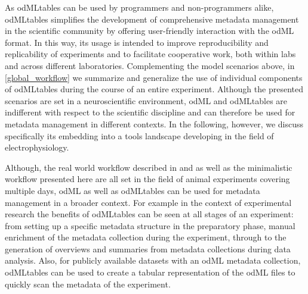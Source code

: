 As odMLtables can be used by programmers and non-programmers alike, odMLtables simplifies the development of comprehensive metadata management in the scientific community by offering user-friendly interaction with the odML format. In this way, its usage is intended to improve reproducibility and replicability of experiments and to facilitate cooperative work, both within labs and across different laboratories. Complementing the model scenarios above, in \cref{global_workflow} we summarize and generalize the use of individual components of odMLtables during the course of an entire experiment. Although the presented scenarios are set in a neuroscientific environment, odML and odMLtables are indifferent with respect to the scientific discipline and can therefore be used for metadata management in different contexts. In the following, however, we discuss specifically its embedding into a tools landscape developing in the field of electrophysiology.

Although, the real world workflow described in \cite{Brochier_2018} and \cite{Zehl_2016} as well as the minimalistic workflow presented here are all set in the field of animal experiments covering multiple days, odML as well as odMLtables can be used for metadata management in a broader context. For example in the context of experimental research the benefits of odMLtables can be seen at all stages of an experiment: from setting up a specific metadata structure in the preparatory phase, manual enrichment of the metadata collection during the experiment, through to the generation of overviews and summaries from metadata collections during data analysis. Also, for publicly available datasets with an odML metadata collection, odMLtables can be used to create a tabular representation of the odML files to quickly scan the metadata of the experiment.

